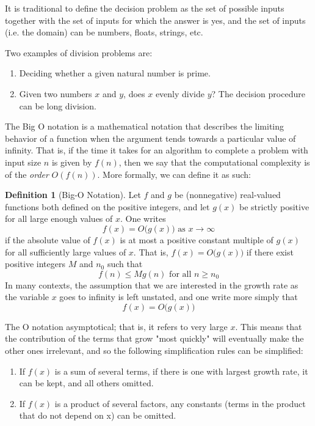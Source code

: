 \documentclass[a4paper, 12pt]{report}
\theoremstyle{remark}
\theoremstyle{definition}
\newtheorem{definition}{Definition}[section]
\begin{document}
It is traditional to define the decision problem as the set of possible inputs together with the set of inputs for which the answer is yes, and the set of inputs (i.e. the domain) can be numbers, floats, strings, etc. 

\begin{example}
Two examples of division problems are: 
\begin{enumerate}
    \item Deciding whether a given natural number is prime. 
    \item Given two numbers $x$ and $y$, does $x$ evenly divide $y$? The decision procedure can be long division. 
\end{enumerate}
\end{example}

The Big O notation is a mathematical notation that describes the limiting behavior of a function when the argument tends towards a particular value of infinity. That is, if the time it takes for an algorithm to complete a problem with input size $n$ is given by $f(n)$, then we say that the computational complexity is of the \textit{order} $O(f(n))$. More formally, we can define it as such: 

\begin{definition}[Big-O Notation]
Let $f$ and $g$ be (nonnegative) real-valued functions both defined on the positive integers, and let $g(x)$ be strictly positive for all large enough values of $x$. One writes
\[f(x) = O\big( g(x)\big) \text{ as } x \rightarrow \infty\]
if the absolute value of $f(x)$ is at most a positive constant multiple of $g(x)$ for all sufficiently large values of $x$. That is, $f(x) = O \big(g(x)\big)$ if there exist positive integers $M$ and $n_0$ such that
\[f(n) \leq M g(n) \text{ for all } n \geq n_0\]
In many contexts, the assumption that we are interested in the growth rate as the variable $x$ goes to infinity is left unstated, and one write more simply that
\[f(x) = O\big( g(x)\big)\]
\end{definition}

The O notation asymptotical; that is, it refers to very large $x$. This means that the contribution of the terms that grow "most quickly" will eventually make the other ones irrelevant, and so the following simplification rules can be simplified: 
\begin{enumerate}
    \item If $f(x)$ is a sum of several terms, if there is one with largest growth rate, it can be kept, and all others omitted.
    \item If $f(x)$ is a product of several factors, any constants (terms in the product that do not depend on x) can be omitted.
\end{enumerate}
\end{document}
